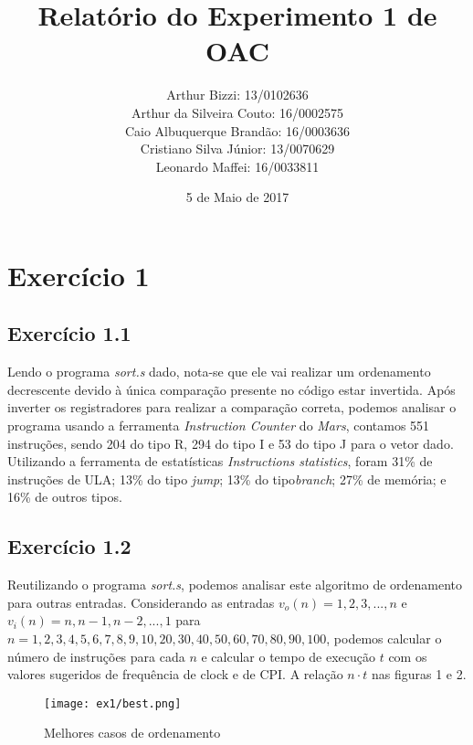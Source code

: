 \documentclass[12pt, a4paper, twoside]{article}
\begin{document}
\title{Relatório do Experimento 1 de OAC}
\author{
Arthur Bizzi: 13/0102636 \\
Arthur da Silveira Couto: 16/0002575 \\
Caio Albuquerque Brandão: 16/0003636 \\
Cristiano Silva Júnior: 13/0070629 \\
Leonardo Maffei: 16/0033811 \\}
\date{5 de Maio de 2017}
\maketitle

\section{Exercício 1}

\subsection{Exercício 1.1}

Lendo o programa \textit{sort.s} dado, nota-se que ele vai realizar um  ordenamento decrescente devido à única comparação presente no código estar  invertida. Após inverter os registradores para realizar a comparação correta, podemos analisar o programa usando a ferramenta \textit{Instruction Counter} do \textit{Mars}, contamos 551 instruções, sendo 204 do tipo R, 294 do tipo I e 53 do tipo J para o vetor dado. Utilizando a ferramenta de estatísticas \textit{Instructions statistics}, foram 31\% de instruções de ULA; 13\% do tipo \textit{jump}; 13\% do tipo\textit{branch}; 27\% de memória; e 16\% de outros tipos.

\subsection{Exercício 1.2}

Reutilizando o programa \textit{sort.s}, podemos analisar este algoritmo de ordenamento para outras entradas. Considerando as entradas $v_o(n) = {1,2,3,...,n}$ e $v_i(n)={n,n-1,n-2,...,1}$ para $n={1,2,3,4,5,6,7,8,9,10,20,30,40,50,60,70,80,90,100}$, podemos calcular o número de instruções para cada $n$ e calcular o tempo de execução $t$ com os valores sugeridos de frequência de clock e de CPI. A relação $n \cdot t$ nas figuras 1 e 2.

\begin{figure}
    \centering
    \texttt{[image: ex1/best.png]}
    \caption{Melhores casos de ordenamento}
\end{figure}
\end{document}

